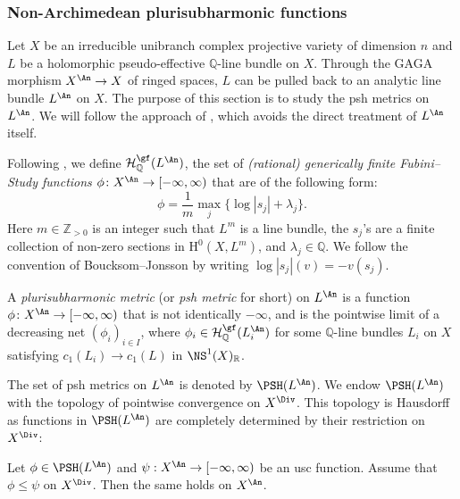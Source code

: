 \subsubsection{Non-Archimedean plurisubharmonic functions}
\label{subsubsec:BJ_NApsh}

Let $X$ be an irreducible unibranch complex projective variety of dimension $n$ and $L$ be a holomorphic pseudo-effective $\mathbb{Q}$-line bundle on $X$. Through the GAGA morphism $X^{\An}\rightarrow X$ of ringed spaces, $L$ can be pulled back to an analytic line bundle $L^{\An}$ on $X$. The purpose of this section is to study the psh metrics on $L^{\An}$. We will follow the approach of \cite{BJ22}, which avoids the direct treatment of $L^{\An}$ itself.

Following \cite[Definition~2.18]{BJ22}, we define $\mathcal{H}^{\gf}_{\mathbb{Q}}(L^{\An})$, the set of \emph{(rational) generically finite Fubini--Study functions} $\phi\colon X^{\An}\rightarrow [-\infty,\infty)$ that are of the following form:
    \begin{equation}
    \phi=\frac{1}{m}\max_j \{\log|s_j|+\lambda_j\}.
    \end{equation}
Here $m\in \mathbb{Z}_{>0}$ is an integer such that $L^m$ is a line bundle, the $s_j$'s are a finite collection of non-zero sections in $\mathrm{H}^0(X,L^m)$, and $\lambda_j\in \mathbb{Q}$. We follow the convention of Boucksom--Jonsson by writing $\log |s_j|(v)=-v(s_j)$.

\begin{definition}[{\cite[Definition~4.1]{BJ22}}]\label{def:BJpshmetric}
A \emph{plurisubharmonic metric} (or \emph{psh metric} for short) on $L^{\An}$ is a function $\phi\colon X^{\An}\rightarrow [-\infty,\infty)$ that is not identically $-\infty$, and is the pointwise limit of a decreasing net $(\phi_i)_{i\in I}$, where $\phi_i\in \mathcal{H}^{\gf}_{\mathbb{Q}}(L_i^{\An})$ for some $\mathbb{Q}$-line bundles $L_i$ on $X$ satisfying $c_1(L_i)\to c_1(L)$ in $\NS^1(X)_{\mathbb{R}}$.
\end{definition}


The set of psh metrics on $L^{\An}$ is denoted by $\PSH(L^{\An})$.
We endow $\PSH(L^{\An})$ with the topology of pointwise convergence on $X^{\Div}$. This topology is Hausdorff as functions in $\PSH(L^{\An})$ are completely determined by their restriction on $X^{\Div}$:
\begin{theorem}[{\cite[Theorem~4.22]{BJ22}}]\label{thm:pshdetbydiv}
Let $\phi \in\PSH(L^{\An})$ and $\psi:X^{\An}\rightarrow [-\infty,\infty)$ be an usc function. Assume that $\phi\leq \psi$ on $X^{\Div}$. Then the same holds on $X^{\An}$.
\end{theorem}



